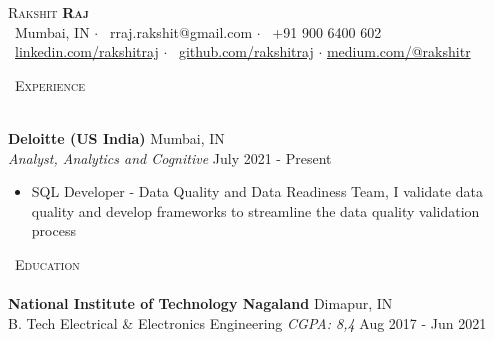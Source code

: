\documentclass{article}
\newcommand{\lineunder} {
    \vspace*{-8pt} \\
    \hspace*{-18pt} \hrulefill \\
}
\newcommand{\header} [1] {
    {\hspace*{-18pt}\vspace*{6pt} \textsc{#1}}
    \vspace*{-6pt} \lineunder
}
\begin{document}
\vspace*{-40pt}

    

\vspace*{-10pt}
\begin{center}
	{\Huge \scshape {Rakshit \textbf{Raj}}}\\	
    \vspace{3mm}
	{\faMapMarker\ Mumbai, IN}	 $\cdot$ 	{\faEnvelope\ rraj.rakshit@gmail.com} $\cdot$ {\faMobile\ +91 900 6400 602} \\
	 \vspace{1mm}
	 {\faLinkedin\ \href{http://www.linkedin.com/in/rakshitraj}{linkedin.com/rakshitraj}} $\cdot$ 	{\faGithub\ \href{http://www.github.com/rakshitraj}{github.com/rakshitraj}}	 $\cdot$ 	{\faMedium \href{http://www.meduim.com/@rakshitr}{  medium.com/@rakshitr}}\\
\end{center}



\vspace{1mm}

\header{\faSuitcase\ Experience}
\vspace{1mm}

\textbf{Deloitte (US India)} \hfill Mumbai, IN\\
\textit{Analyst, Analytics and Cognitive} \hfill July 2021 - Present\\
\vspace{-1mm}
\begin{itemize} \itemsep 1pt
	\item SQL Developer - Data Quality and Data Readiness Team, I validate data quality and develop frameworks to streamline the data quality validation process
\end{itemize}

\header{\faGraduationCap\ Education}
\textbf{National Institute of Technology Nagaland} \hfill Dimapur, IN\\
B. Tech Electrical \& Electronics Engineering \textit{CGPA: 8,4 } \hfill Aug 2017 - Jun 2021\\
\vspace{2mm}


\end{document}
